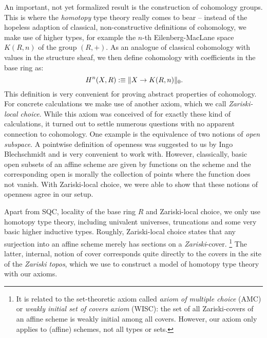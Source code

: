 An important, not yet formalized result
is the construction of cohomology groups.
This is where the \emph{homotopy} type theory really comes to bear --
instead of the hopeless adaption of classical, non-constructive definitions of cohomology,
we make use of higher types,
for example the $n$-th Eilenberg-MacLane space $K(R,n)$ of the group $(R,+)$.
As an analogue of classical cohomology with values in the structure sheaf,
we then define cohomology with coefficients in the base ring as:
\[
  H^n(X,R):\equiv \propTrunc{X\to K(R,n)}_0
  \rlap{.}
\]
This definition is very convenient for proving abstract properties of cohomology.
For concrete calculations we make use of another axiom,
which we call \emph{Zariski-local choice}.
While this axiom was conceived of for exactly these kind of calculations,
it turned out to settle numerous questions with no apparent connection to cohomology.
One example is the equivalence of two notions of \emph{open subspace}.
A pointwise definition of openness was suggested to us by Ingo Blechschmidt and
is very convenient to work with.
However, classically, basic open subsets of an affine scheme are given
by functions on the scheme and the corresponding open is morally the collection of points where the function does not vanish.
With Zariski-local choice, we were able to show that these notions of openness agree in our setup.

Apart from SQC, locality of the base ring $R$ and Zariski-local choice,
we only use homotopy type theory, including univalent universes, truncations and some very basic higher inductive types.
Roughly, Zariski-local choice states that any surjection into an affine scheme merely has sections on a \emph{Zariski}-cover.%
\footnote{It is related to the set-theoretic axiom called
\emph{axiom of multiple choice} (AMC) \cite{vandenberg-moerdijk-amc} or \emph{weakly initial set of covers axiom} (WISC):
the set of all Zariski-covers of an affine scheme is weakly initial among all covers.
However, our axiom only applies to (affine) schemes, not all types or sets.}
The latter, internal, notion of cover corresponds quite directly to the covers in the site of the \emph{Zariski topos},
which we use to construct a model of homotopy type theory with our axioms.

